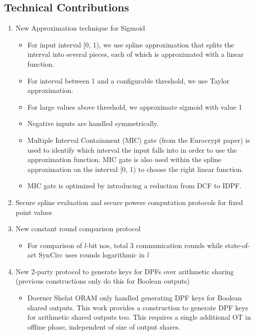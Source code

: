 \subsection{Technical Contributions}
\begin{enumerate}
    \item New Approximation technique for Sigmoid
    \begin{itemize}
        \item For input interval [0, 1), we use spline approximation that splits the interval into several pieces, each of which is approximated with a linear function.
        \item For interval between 1 and a configurable threshold, we use Taylor approximation.
        \item For large values above threshold, we approximate sigmoid with value 1
        \item Negative inputs are handled symmetrically.
        \item Multiple Interval Containment (MIC) gate (from the Eurocrypt paper) is used to identify which interval the input falls into in order to use the approximation function. MIC gate is also used within the spline approximation on the interval [0, 1) to choose the right linear function.
        \item MIC gate is optimized by introducing a reduction from DCF to IDPF.
    \end{itemize}
    \item Secure spline evaluation and secure powers computation protocols for fixed point values
    \item New constant round comparison protocol
        \begin{itemize}
            \item For comparison of $l$-bit nos, total 3 communication rounds while state-of-art SynCirc uses rounds logarithmic in $l$
        \end{itemize}
    \item New 2-party protocol to generate keys for DPFs over arithmetic sharing (previous constructions only do this for Boolean outputs)
        \begin{itemize}
            \item Doerner Shelat ORAM only handled generating DPF keys for Boolean shared outputs. This work provides a construction to generate DPF keys for arithmetic shared outputs too. This requires a single additional OT in offline phase, independent of size of output shares.
        \end{itemize}
\end{enumerate}


